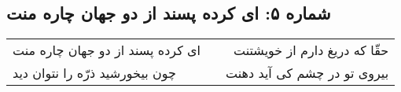 \begin{center}
\section*{شماره ۵: ای کرده پسند از دو جهان چاره منت}
\label{sec:005}
\begin{longtable}{l p{0.5cm} r}
ای کرده پسند از دو جهان چاره منت
&&
حقّا که دریغ دارم از خویشتنت
\\
چون بیخورشید ذرّه را نتوان دید
&&
بیروی تو در چشم کی آید دهنت
\\
\end{longtable}
\end{center}
